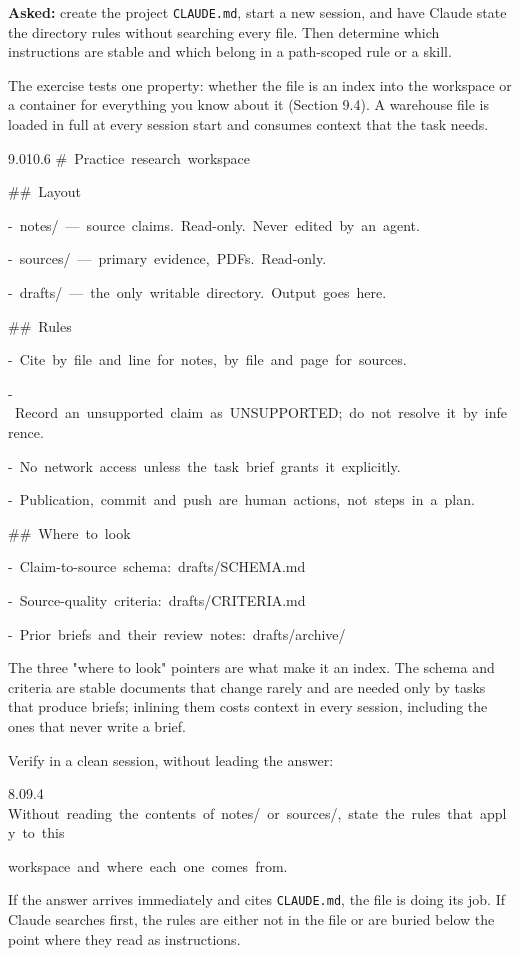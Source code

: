 \documentclass[11pt,a4paper,twoside,openany]{book}
\newcommand{\cl}[1]{\noindent\mbox{#1}\par}
\begin{document}
\textbf{Asked:} create the project \texttt{CLAUDE.\allowbreak{}md}, start a new session, and have Claude state the directory rules without searching every file. Then determine which instructions are stable and which belong in a path-scoped rule or a skill.


The exercise tests one property: whether the file is an index into the workspace or a container for everything you know about it (Section 9.4). A warehouse file is loaded in full at every session start and consumes context that the task needs.


\begin{codeblock}{9.0}{10.6}
\cl{\#~Practice~research~workspace}
\cl{}
\cl{\#\#~Layout}
\cl{-~\textasciigrave{}notes/\textasciigrave{}~—~source~claims.~Read-only.~Never~edited~by~an~agent.}
\cl{-~\textasciigrave{}sources/\textasciigrave{}~—~primary~evidence,~PDFs.~Read-only.}
\cl{-~\textasciigrave{}drafts/\textasciigrave{}~—~the~only~writable~directory.~Output~goes~here.}
\cl{}
\cl{\#\#~Rules}
\cl{-~Cite~by~file~and~line~for~notes,~by~file~and~page~for~sources.}
\cl{-~Record~an~unsupported~claim~as~UNSUPPORTED;~do~not~resolve~it~by~inference.}
\cl{-~No~network~access~unless~the~task~brief~grants~it~explicitly.}
\cl{-~Publication,~commit~and~push~are~human~actions,~not~steps~in~a~plan.}
\cl{}
\cl{\#\#~Where~to~look}
\cl{-~Claim-to-source~schema:~\textasciigrave{}drafts/SCHEMA.md\textasciigrave{}}
\cl{-~Source-quality~criteria:~\textasciigrave{}drafts/CRITERIA.md\textasciigrave{}}
\cl{-~Prior~briefs~and~their~review~notes:~\textasciigrave{}drafts/archive/\textasciigrave{}}
\end{codeblock}

The three "where to look" pointers are what make it an index. The schema and criteria are stable documents that change rarely and are needed only by tasks that produce briefs; inlining them costs context in every session, including the ones that never write a brief.


Verify in a clean session, without leading the answer:


\begin{codeblock}{8.0}{9.4}
\cl{Without~reading~the~contents~of~notes/~or~sources/,~state~the~rules~that~apply~to~this}
\cl{workspace~and~where~each~one~comes~from.}
\end{codeblock}

If the answer arrives immediately and cites \texttt{CLAUDE.\allowbreak{}md}, the file is doing its job. If Claude searches first, the rules are either not in the file or are buried below the point where they read as instructions.
\end{document}
